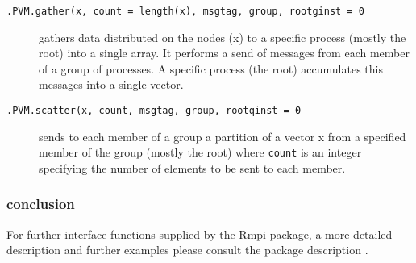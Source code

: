 \begin{description}
\item[\texttt{.PVM.gather(x, count = length(x), msgtag, group,
    rootginst = 0}] gathers data distributed on the nodes (x) to a
  specific process (mostly the root) into a single array. It performs
  a send of messages from each member of a group of processes. A
  specific process (the root) accumulates this messages into a single vector.
\item[\texttt{.PVM.scatter(x, count, msgtag, group, rootqinst = 0}]
  sends to each member of a group a partition of  a vector x from a
  specified member of the group (mostly the root) where \texttt{count}
  is an integer specifying the number of elements to be sent to each
  member. 
\end{description}

\subsubsection{conclusion}


For further interface functions supplied by the Rmpi package, a more detailed
description and further examples please consult the package description
\cite{yu06Rmpi}.
